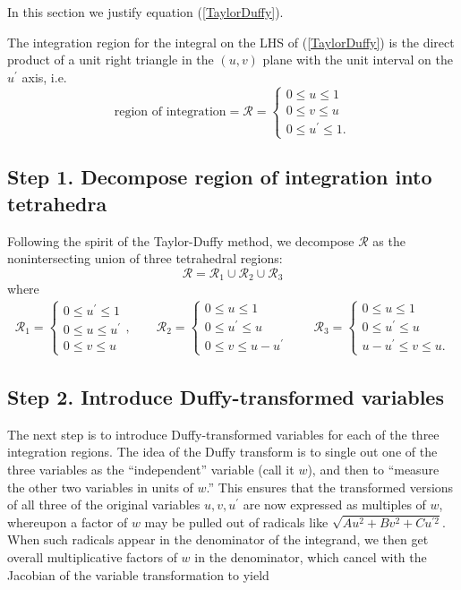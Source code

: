 \documentclass[letterpaper]{article}
\begin{document}
In this section we justify equation 
(\ref{TaylorDuffy}).

The integration region for the integral on the LHS of 
(\ref{TaylorDuffy}) is the direct product of a unit
right triangle in the $(u,v)$ plane with the unit 
interval on the $u^\prime$ axis, i.e. 
$$\text{region of integration}=\mathcal{R}=
  \begin{cases}
  0\le u \le 1 \\
  0\le v \le u \\
  0\le u^\prime \le 1.
  \end{cases}
$$

\subsection*{Step 1. Decompose region of integration into tetrahedra}

Following the spirit of the Taylor-Duffy method, we 
decompose $\mathcal{R}$ as the nonintersecting union 
of three tetrahedral regions:
$$ \mathcal{R} = \mathcal{R}_1 \cup
                 \mathcal{R}_2 \cup
                 \mathcal{R}_3
$$
where 
\begin{align*}
  \mathcal{R}_1 = 
  \begin{cases}
  0 \le u^\prime \le 1 \\
  0 \le u \le u^\prime \\
  0 \le v \le u
  \end{cases},
\qquad
  \mathcal{R}_2 = 
  \begin{cases}
  0 \le u \le 1 \\
  0 \le u^\prime \le u \\
  0 \le v \le u-u^\prime
  \end{cases}
\qquad
  \mathcal{R}_3 = 
  \begin{cases}
  0 \le u \le 1 \\
  0 \le u^\prime \le u \\
  u-u^\prime \le v \le u.
  \end{cases}
\end{align*}

\subsection*{Step 2. Introduce Duffy-transformed variables} 

The next step is to introduce Duffy-transformed variables for each 
of the three integration regions. The idea of the Duffy transform
is to single out one of the three variables as the ``independent''
variable (call it $w$), and then to ``measure the other two variables
in units of $w$.'' This ensures that the transformed versions of 
all three of the original variables $u,v,u^\prime$ are now expressed
as multiples of $w$, whereupon a factor of $w$ may be pulled out 
of radicals like $\sqrt{Au^2 + Bv^2 + Cu^{\prime 2}}$. When such radicals
appear in the denominator of the integrand, we then get overall 
multiplicative factors of $w$ in the denominator, which cancel with
the Jacobian of the variable transformation to yield 
\end{document}
